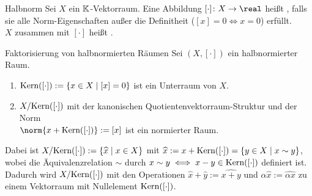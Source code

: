 \linie

\begin{Def}{Halbnorm}
    Sei $X$ ein $\mathbb{K}$-Vektorraum.
    Eine Abbildung $[\cdot]\colon X \rightarrow \real$ heißt ,
    falls sie alle Norm-Eigenschaften außer
    die Definitheit ($[x] = 0 \iff x = 0$) erfüllt.\\
    $X$ zusammen mit $[\cdot]$ heißt .
\end{Def}

\begin{Satz}{Faktorisierung von halbnormierten Räumen}
    Sei $(X, [\cdot])$ ein halbnormierter Raum.
    \begin{enumerate}
        \item
        $\text{Kern}([\cdot]) := \{x \in X \;|\; [x] = 0\}$ ist ein Unterraum von $X$.

        \item
        $X/\text{Kern}([\cdot])$ mit der kanonischen Quotientenvektorraum-Struktur und der Norm\\
        $\norm{x + \Kern([\cdot])} := [x]$ ist ein normierter Raum.
    \end{enumerate}
\end{Satz}

\begin{Bem}
    Dabei ist $X/\text{Kern}([\cdot]) := \{\widehat{x} \;|\; x \in X\}$
    mit $\widehat{x} := x + \text{Kern}([\cdot]) = \{y \in X \;|\; x \sim y\}$,
    wobei die Äquivalenzrelation $\sim$ durch
    $x \sim y \iff x - y \in \text{Kern}([\cdot])$ definiert ist.
    Dadurch wird $X/\text{Kern}([\cdot])$ mit den Operationen
    $\widehat{x} + \widehat{y} := \widehat{x + y}$ und
    $\alpha \widehat{x} := \widehat{\alpha x}$ zu einem Vektorraum mit
    Nullelement $\text{Kern}([\cdot])$.
\end{Bem}

\linie
\pagebreak

